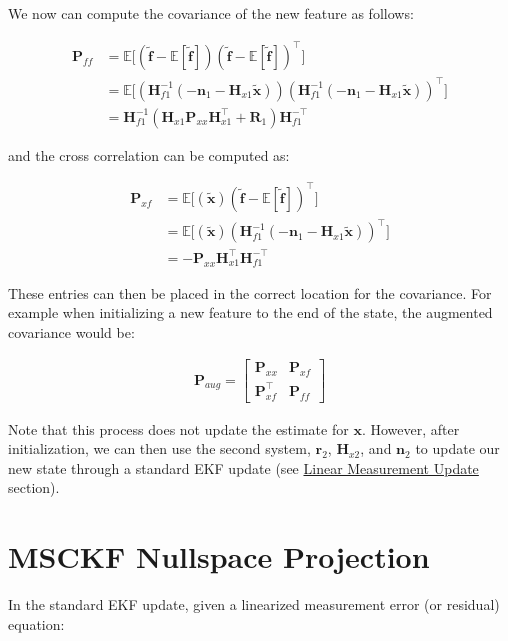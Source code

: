 We now can compute the covariance of the new feature as follows\+:

\begin{align*} \mathbf{P}_{ff} &= \mathbb{E}\Big[(\tilde{\mathbf{f}}-\mathbb{E}[\tilde{\mathbf{f}}]) (\tilde{\mathbf{f}}-\mathbb{E}[\tilde{\mathbf{f}}])^{\top}\Big] \\ &= \mathbb{E}\Big[(\mathbf{H}_{f1}^{-1}(-\mathbf{n}_1-\mathbf{H}_{x1}\tilde{\mathbf{x}})) (\mathbf{H}_{f1}^{-1}(-\mathbf{n}_1-\mathbf{H}_{x1}\tilde{\mathbf{x}}))^{\top}\Big] \\ &= \mathbf{H}_{f1}^{-1}(\mathbf{H}_{x1}\mathbf{P}_{xx}\mathbf{H}_{x1}^{\top} + \mathbf{R}_1)\mathbf{H}_{f1}^{-\top} \end{align*}

and the cross correlation can be computed as\+:

\begin{align*} \mathbf{P}_{xf} &= \mathbb{E}\Big[(\tilde{\mathbf{x}}) (\tilde{\mathbf{f}}-\mathbb{E}[\tilde{\mathbf{f}}])^{\top}\Big] \\ &= \mathbb{E}\Big[(\tilde{\mathbf{x}}) (\mathbf{H}_{f1}^{-1}(-\mathbf{n}_1-\mathbf{H}_{x1}\tilde{\mathbf{x}}))^{\top}\Big] \\ &= -\mathbf{P}_{xx}\mathbf{H}_{x1}^{\top}\mathbf{H}_{f1}^{-\top} \end{align*}

These entries can then be placed in the correct location for the covariance. For example when initializing a new feature to the end of the state, the augmented covariance would be\+:

\begin{align*} \mathbf{P}_{aug} = \begin{bmatrix} \mathbf{P}_{xx} & \mathbf{P}_{xf} \\ \mathbf{P}_{xf}^{\top} & \mathbf{P}_{ff} \end{bmatrix} \end{align*}

Note that this process does not update the estimate for $\mathbf{x}$. However, after initialization, we can then use the second system, $\mathbf{r}_2$, $\mathbf{H}_{x2}$, and $\mathbf{n}_2$ to update our new state through a standard E\+KF update (see \hyperlink{update_linear-meas}{Linear Measurement Update} section). \hypertarget{update-null}{}\section{M\+S\+C\+KF Nullspace Projection}\label{update-null}
In the standard E\+KF update, given a linearized measurement error (or residual) equation\+:

